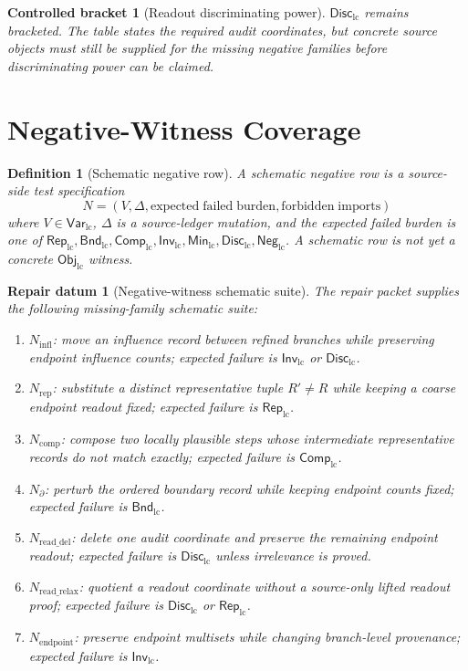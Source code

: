 \documentclass[11pt]{article}
\newcommand{\ObjLC}{\mathsf{Obj}_{\mathrm{lc}}}
\newcommand{\VarLC}{\mathsf{Var}_{\mathrm{lc}}}
\newcommand{\RepLC}{\mathsf{Rep}_{\mathrm{lc}}}
\newcommand{\BndLC}{\mathsf{Bnd}_{\mathrm{lc}}}
\newcommand{\CompLC}{\mathsf{Comp}_{\mathrm{lc}}}
\newcommand{\InvLC}{\mathsf{Inv}_{\mathrm{lc}}}
\newcommand{\MinLC}{\mathsf{Min}_{\mathrm{lc}}}
\newcommand{\DiscLC}{\mathsf{Disc}_{\mathrm{lc}}}
\newcommand{\NegLC}{\mathsf{Neg}_{\mathrm{lc}}}
\newtheorem{definition}{Definition}
\newtheorem{repair}{Repair datum}
\newtheorem{bracket}{Controlled bracket}
\begin{document}
\begin{bracket}[Readout discriminating power]
\(\DiscLC\) remains bracketed. The table states the required audit
coordinates, but concrete source objects must still be supplied for
the missing negative families before discriminating power can be
claimed.
\end{bracket}

\section{Negative-Witness Coverage}

\begin{definition}[Schematic negative row]
A schematic negative row is a source-side test specification
\[
N=(V,\Delta,\mathrm{expected\;failed\;burden},\mathrm{forbidden\;imports})
\]
where \(V\in\VarLC\), \(\Delta\) is a source-ledger mutation, and the
expected failed burden is one of \(\RepLC,\BndLC,\CompLC,\InvLC,
\MinLC,\DiscLC,\NegLC\). A schematic row is not yet a concrete
\(\ObjLC\) witness.
\end{definition}

\begin{repair}[Negative-witness schematic suite]
The repair packet supplies the following missing-family schematic
suite:
\begin{enumerate}
    \item \(N_{\mathrm{infl}}\): move an influence record between
    refined branches while preserving endpoint influence counts;
    expected failure is \(\InvLC\) or \(\DiscLC\).
    \item \(N_{\mathrm{rep}}\): substitute a distinct representative
    tuple \(R'\neq R\) while keeping a coarse endpoint readout fixed;
    expected failure is \(\RepLC\).
    \item \(N_{\mathrm{comp}}\): compose two locally plausible steps
    whose intermediate representative records do not match exactly;
    expected failure is \(\CompLC\).
    \item \(N_{\partial}\): perturb the ordered boundary record while
    keeping endpoint counts fixed; expected failure is \(\BndLC\).
    \item \(N_{\mathrm{read\_del}}\): delete one audit coordinate and
    preserve the remaining endpoint readout; expected failure is
    \(\DiscLC\) unless irrelevance is proved.
    \item \(N_{\mathrm{read\_relax}}\): quotient a readout coordinate
    without a source-only lifted readout proof; expected failure is
    \(\DiscLC\) or \(\RepLC\).
    \item \(N_{\mathrm{endpoint}}\): preserve endpoint multisets while
    changing branch-level provenance; expected failure is \(\InvLC\).
\end{enumerate}
\end{repair}
\end{document}
